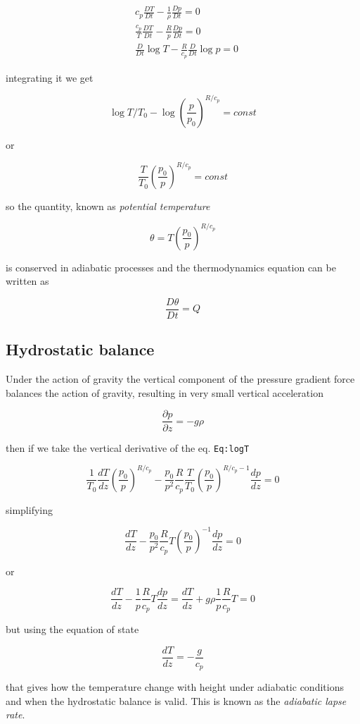 \[\begin{aligned}
&c_p\frac{D T}{Dt}  - \frac{1}{\rho}\frac{D p}{Dt} = 0\\
&\frac{c_p}{T}\frac{D T}{Dt} -\frac{R}{p}\frac{D p}{Dt} = 0\\
&\frac{D }{Dt}\log{T} - \frac{R}{c_p}\frac{D }{Dt}\log{p} = 0
\end{aligned}\]

integrating it we get

\[\log{T/T_0} - \log{\left(\frac{p}{p_0}\right)^{R/c_p}} = const\]

or

\[\frac{T}{T_0}\left(\frac{p_0}{p}\right)^{R/c_p} = const\]

so the quantity, known as \emph{potential temperature}

\[\theta = T\left(\frac{p_0}{p}\right)^{R/c_p}\]

is conserved in adiabatic processes and the thermodynamics equation can
be written as

\[\frac{D \theta}{Dt} = Q\]

\subsection{Hydrostatic balance}\label{hydrostatic-balance}

Under the action of gravity the vertical component of the pressure
gradient force balances the action of gravity, resulting in very small
vertical acceleration

\[\frac{\partial p}{\partial z} =  -g \rho\]

then if we take the vertical derivative of the eq. \texttt{Eq:logT}

\[\frac{1}{T_0}\frac{d T}{dz}\left(\frac{p_0}{p}\right)^{R/c_p} -\frac{p_0}{p^2}\frac{R}{c_p}\frac{T}{T_0}\left(\frac{p_0}{p}\right)^{R/c_p-1}\frac{d p}{dz} = 0\]

simplifying

\[\frac{d T}{dz} -\frac{p_0}{p^2}\frac{R}{c_p}T\left(\frac{p_0}{p}\right)^{-1}\frac{d p}{dz} = 0\]

or

\[\frac{d T}{dz} -\frac{1}{p}\frac{R}{c_p}T\frac{d p}{dz} = \frac{d T}{dz} +g\rho\frac{1}{p}\frac{R}{c_p}T = 0\]

but using the equation of state

\[\frac{d T}{dz} = -\frac{g}{c_p}\]

that gives how the temperature change with height under adiabatic
conditions and when the hydrostatic balance is valid. This is known as
the \emph{adiabatic lapse rate}.

